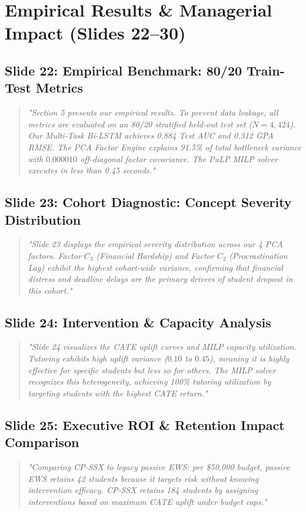 \documentclass[11pt, a4paper]{article}
\begin{document}
\section{Empirical Results \& Managerial Impact (Slides 22--30)}

\subsection{Slide 22: Empirical Benchmark: 80/20 Train-Test Metrics}
\begin{quote}\small \itshape
"Section 5 presents our empirical results. To prevent data leakage, all metrics are evaluated on an 80/20 stratified held-out test set ($N=4,424$). Our Multi-Task Bi-LSTM achieves 0.884 Test AUC and 0.312 GPA RMSE. The PCA Factor Engine explains 91.5\% of total bottleneck variance with $0.000010$ off-diagonal factor covariance. The PuLP MILP solver executes in less than 0.45 seconds."
\end{quote}

\subsection{Slide 23: Cohort Diagnostic: Concept Severity Distribution}
\begin{quote}\small \itshape
"Slide 23 displays the empirical severity distribution across our 4 PCA factors. Factor $C_3$ (Financial Hardship) and Factor $C_2$ (Procrastination Lag) exhibit the highest cohort-wide variance, confirming that financial distress and deadline delays are the primary drivers of student dropout in this cohort."
\end{quote}

\subsection{Slide 24: Intervention \& Capacity Analysis}
\begin{quote}\small \itshape
"Slide 24 visualizes the CATE uplift curves and MILP capacity utilization. Tutoring exhibits high uplift variance ($0.10$ to $0.45$), meaning it is highly effective for specific students but less so for others. The MILP solver recognizes this heterogeneity, achieving 100\% tutoring utilization by targeting students with the highest CATE return."
\end{quote}

\subsection{Slide 25: Executive ROI \& Retention Impact Comparison}
\begin{quote}\small \itshape
"Comparing CP-SSX to legacy passive EWS: per \$50,000 budget, passive EWS retains 42 students because it targets risk without knowing intervention efficacy. CP-SSX retains 184 students by assigning interventions based on maximum CATE uplift under budget caps."
\end{quote}
\end{document}
